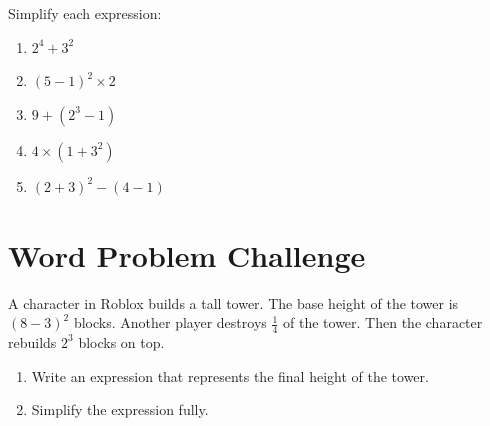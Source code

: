 \documentclass[11pt]{article}
\begin{document}
Simplify each expression:

\begin{enumerate}[label=\textbf{(\arabic*)}]
    \item \( 2^4 + 3^2 \)
    \item \( (5 - 1)^2 \times 2 \)
    \item \( 9 + (2^3 - 1) \)
    \item \( 4 \times (1 + 3^2) \)
    \item \( (2 + 3)^2 - (4 - 1) \)
\end{enumerate}

\vspace{1cm}

\section*{Word Problem Challenge}

A character in Roblox builds a tall tower.  
The base height of the tower is \((8 - 3)^2\) blocks.  
Another player destroys \( \frac{1}{4} \) of the tower.  
Then the character rebuilds \(2^3\) blocks on top.

\begin{enumerate}[label=\textbf{(\alph*)}]
    \item Write an expression that represents the final height of the tower.
    \item Simplify the expression fully.
\end{enumerate}
\end{document}
